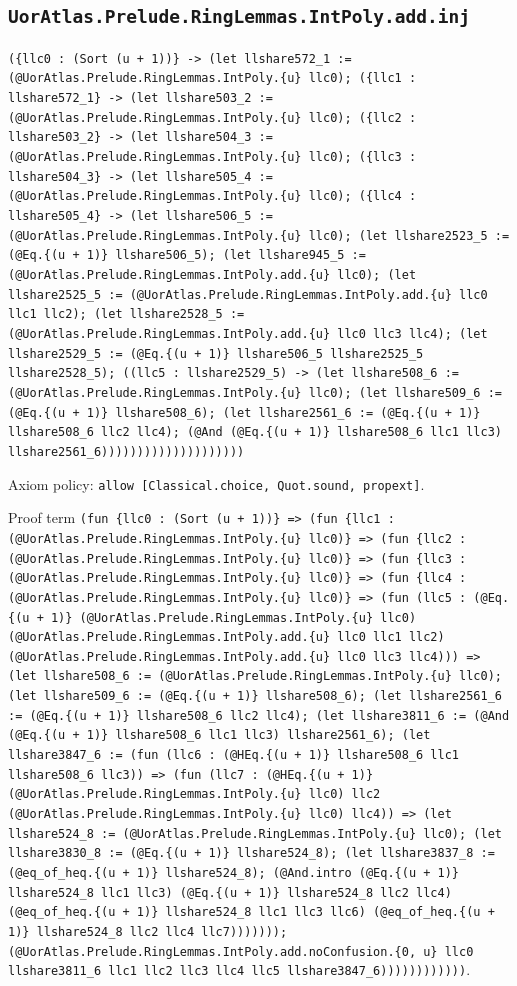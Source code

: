 \documentclass[11pt]{article}
\begin{document}
\subsection*{\texttt{UorAtlas.Prelude.RingLemmas.IntPoly.add.inj}}
\noindent\texttt{(\{llc0 : (Sort (u + 1))\} -> (let llshare572\_1 := (@UorAtlas.Prelude.RingLemmas.IntPoly.\{u\} llc0); (\{llc1 : llshare572\_1\} -> (let llshare503\_2 := (@UorAtlas.Prelude.RingLemmas.IntPoly.\{u\} llc0); (\{llc2 : llshare503\_2\} -> (let llshare504\_3 := (@UorAtlas.Prelude.RingLemmas.IntPoly.\{u\} llc0); (\{llc3 : llshare504\_3\} -> (let llshare505\_4 := (@UorAtlas.Prelude.RingLemmas.IntPoly.\{u\} llc0); (\{llc4 : llshare505\_4\} -> (let llshare506\_5 := (@UorAtlas.Prelude.RingLemmas.IntPoly.\{u\} llc0); (let llshare2523\_5 := (@Eq.\{(u + 1)\} llshare506\_5); (let llshare945\_5 := (@UorAtlas.Prelude.RingLemmas.IntPoly.add.\{u\} llc0); (let llshare2525\_5 := (@UorAtlas.Prelude.RingLemmas.IntPoly.add.\{u\} llc0 llc1 llc2); (let llshare2528\_5 := (@UorAtlas.Prelude.RingLemmas.IntPoly.add.\{u\} llc0 llc3 llc4); (let llshare2529\_5 := (@Eq.\{(u + 1)\} llshare506\_5 llshare2525\_5 llshare2528\_5); ((llc5 : llshare2529\_5) -> (let llshare508\_6 := (@UorAtlas.Prelude.RingLemmas.IntPoly.\{u\} llc0); (let llshare509\_6 := (@Eq.\{(u + 1)\} llshare508\_6); (let llshare2561\_6 := (@Eq.\{(u + 1)\} llshare508\_6 llc2 llc4); (@And (@Eq.\{(u + 1)\} llshare508\_6 llc1 llc3) llshare2561\_6))))))))))))))))))))}\par
\noindent Axiom policy: \texttt{allow [Classical.choice, Quot.sound, propext]}.\par
\noindent Proof term \texttt{(fun \{llc0 : (Sort (u + 1))\} => (fun \{llc1 : (@UorAtlas.Prelude.RingLemmas.IntPoly.\{u\} llc0)\} => (fun \{llc2 : (@UorAtlas.Prelude.RingLemmas.IntPoly.\{u\} llc0)\} => (fun \{llc3 : (@UorAtlas.Prelude.RingLemmas.IntPoly.\{u\} llc0)\} => (fun \{llc4 : (@UorAtlas.Prelude.RingLemmas.IntPoly.\{u\} llc0)\} => (fun (llc5 : (@Eq.\{(u + 1)\} (@UorAtlas.Prelude.RingLemmas.IntPoly.\{u\} llc0) (@UorAtlas.Prelude.RingLemmas.IntPoly.add.\{u\} llc0 llc1 llc2) (@UorAtlas.Prelude.RingLemmas.IntPoly.add.\{u\} llc0 llc3 llc4))) => (let llshare508\_6 := (@UorAtlas.Prelude.RingLemmas.IntPoly.\{u\} llc0); (let llshare509\_6 := (@Eq.\{(u + 1)\} llshare508\_6); (let llshare2561\_6 := (@Eq.\{(u + 1)\} llshare508\_6 llc2 llc4); (let llshare3811\_6 := (@And (@Eq.\{(u + 1)\} llshare508\_6 llc1 llc3) llshare2561\_6); (let llshare3847\_6 := (fun (llc6 : (@HEq.\{(u + 1)\} llshare508\_6 llc1 llshare508\_6 llc3)) => (fun (llc7 : (@HEq.\{(u + 1)\} (@UorAtlas.Prelude.RingLemmas.IntPoly.\{u\} llc0) llc2 (@UorAtlas.Prelude.RingLemmas.IntPoly.\{u\} llc0) llc4)) => (let llshare524\_8 := (@UorAtlas.Prelude.RingLemmas.IntPoly.\{u\} llc0); (let llshare3830\_8 := (@Eq.\{(u + 1)\} llshare524\_8); (let llshare3837\_8 := (@eq\_of\_heq.\{(u + 1)\} llshare524\_8); (@And.intro (@Eq.\{(u + 1)\} llshare524\_8 llc1 llc3) (@Eq.\{(u + 1)\} llshare524\_8 llc2 llc4) (@eq\_of\_heq.\{(u + 1)\} llshare524\_8 llc1 llc3 llc6) (@eq\_of\_heq.\{(u + 1)\} llshare524\_8 llc2 llc4 llc7))))))); (@UorAtlas.Prelude.RingLemmas.IntPoly.add.noConfusion.\{0, u\} llc0 llshare3811\_6 llc1 llc2 llc3 llc4 llc5 llshare3847\_6))))))))))))}.\par
\end{document}

